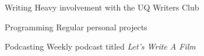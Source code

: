 


\begin{cvskills}


\cvskill
{Writing} %
{Heavy involvement with the UQ Writers Club} %


\cvskill
{Programming} %
{Regular personal projects} %


\cvskill
{Podcasting} %
{Weekly podcast titled \textit{Let's Write A Film}} %




\end{cvskills}